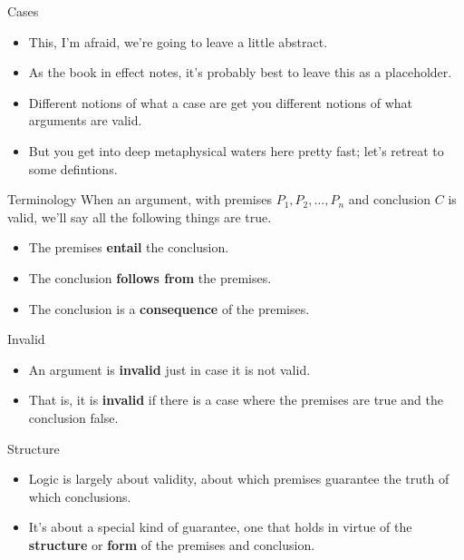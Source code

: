 \documentclass[
  ignorenonframetext,
]{beamer}
\providecommand{\tightlist}{%
  \setlength{\itemsep}{0pt}\setlength{\parskip}{0pt}}
\renewcommand{\,}{\text{, }}
\begin{document}
\begin{frame}{Cases}
\protect\hypertarget{cases}{}
\begin{itemize}
\tightlist
\item
  This, I'm afraid, we're going to leave a little abstract.
\item
  As the book in effect notes, it's probably best to leave this as a
  placeholder.
\item
  Different notions of what a case are get you different notions of what
  arguments are valid.
\item
  But you get into deep metaphysical waters here pretty fast; let's
  retreat to some defintions.
\end{itemize}
\end{frame}

\begin{frame}{Terminology}
\protect\hypertarget{terminology}{}
When an argument, with premises \(P_1, P_2, \dots, P_n\) and conclusion
\(C\) is valid, we'll say all the following things are true. \pause

\begin{itemize}
\tightlist
\item
  The premises \textbf{entail} the conclusion. \pause
\item
  The conclusion \textbf{follows from} the premises. \pause
\item
  The conclusion is a \textbf{consequence} of the premises.
\end{itemize}
\end{frame}

\begin{frame}{Invalid}
\protect\hypertarget{invalid}{}
\begin{itemize}
\tightlist
\item
  An argument is \textbf{invalid} just in case it is not valid. \pause
\item
  That is, it is \textbf{invalid} if there is a case where the premises
  are true and the conclusion false.
\end{itemize}
\end{frame}

\begin{frame}{Structure}
\protect\hypertarget{structure}{}
\begin{itemize}
\tightlist
\item
  Logic is largely about validity, about which premises guarantee the
  truth of which conclusions.
\item
  It's about a special kind of guarantee, one that holds in virtue of
  the \textbf{structure} or \textbf{form} of the premises and
  conclusion.
\end{itemize}
\end{frame}
\end{document}
